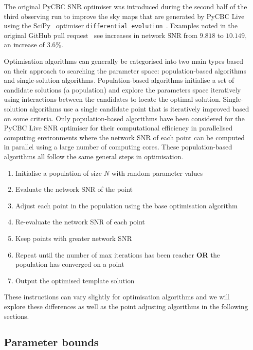 The original PyCBC SNR optimiser was introduced during the second half of the third observing run to improve the sky maps that are generated by PyCBC Live using the SciPy~\cite{SciPy:2020} optimiser \texttt{differential evolution}~\cite{DE:1997}. Examples noted in the original GitHub pull request~\cite{pycbc_pull_request_2659} see increases in network SNR from $9.818$ to $10.149$, an increase of $3.6\%$.

Optimisation algorithms can generally be categorised into two main types based on their approach to searching the parameter space: population-based algorithms and single-solution algorithms. Population-based algorithms initialise a set of candidate solutions (a population) and explore the parameters space iteratively using interactions between the candidates to locate the optimal solution. Single-solution algorithms use a single candidate point that is iteratively improved based on some criteria. Only population-based algorithms have been considered for the PyCBC Live SNR optimiser for their computational efficiency in parallelised computing environments where the network SNR of each point can be computed in parallel using a large number of computing cores. These population-based algorithms all follow the same general steps in optimisation.
%
\begin{enumerate}
    \item Initialise a population of size $N$ with random parameter values
    \item Evaluate the network SNR of the point
    \item Adjust each point in the population using the base optimisation algorithm
    \item Re-evaluate the network SNR of each point
    \item Keep points with greater network SNR
    \item Repeat until the number of max iterations has been reacher \textbf{OR} the population has converged on a point
    \item Output the optimised template solution
\end{enumerate}
%
These instructions can vary slightly for optimisation algorithms and we will explore these differences as well as the point adjusting algorithms in the following sections.

\subsection{\label{7:sec:original_bounds}Parameter bounds}

